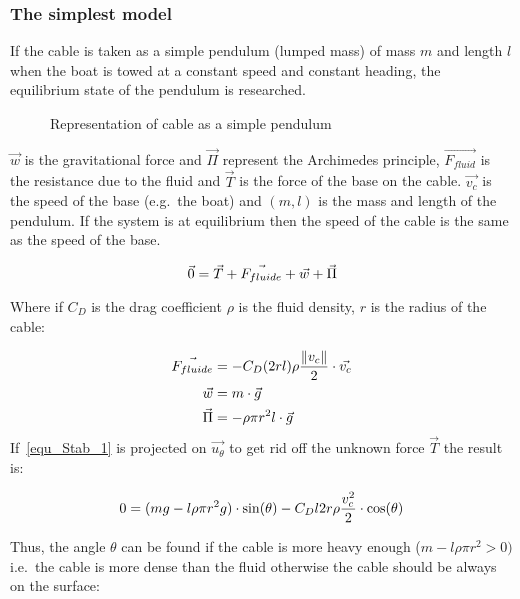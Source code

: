 \subsubsection*{The simplest model}

If the cable is taken as a simple pendulum (lumped mass) of mass $m$ and length $l$ when the boat is towed at a constant speed and constant heading, the equilibrium state of the pendulum is researched.


\begin{figure}[H]
\centering
{} %
{

}
\caption{Representation of cable as a simple pendulum}
\label{fig:model_pendulum}
\end{figure}


$\vec{w}$ is the gravitational force and $\vec{\Pi}$ represent the Archimedes principle, $\vec{F_{fluid}}$ is the resistance due to the fluid and $\vec{T}$ is the force of the base on the cable. $\vec{v_c}$ is the speed of the base (e.g.\ the boat) and $(m,l)$ is the mass and length of the pendulum. If the system is at equilibrium then the speed of the cable is the same as the speed of the base. 

\begin{equation}
 \vec{0} = \vec{T}+\vec{F_{fluide}}+\vec{w}+\vec{\Pi}\\
 \label{equ_Stab_1}
\end{equation}


Where if $C_D$ is the drag coefficient $\rho$ is the fluid density, $r$ is the radius of the cable:


{
\begin{align}
\centering
\vec{F_{fluide}} &= -C_D (2 r l) \rho \frac{ \|v_c\|}{2} \cdot \vec{v_c} \\
\vec{w} &= m \cdot \vec{g} \\
\vec{\Pi} &= - \rho \pi r^2 l \cdot \vec{g}
\end{align}
}
If~\ref{equ_Stab_1} is projected on $\vec{u_{\theta}}$ to get rid off the unknown force $\vec{T}$ the result is:

\begin{equation}
 0 = (m g - l \rho \pi r^2 g) \cdot \sin(\theta)-C_D l 2 r \rho \frac{v_c^2}{2} \cdot \cos(\theta)\\
 \label{equ_Stab_2}
\end{equation}

Thus, the angle $\theta$ can be found if the cable is more heavy enough ($m -l \rho \pi r^2 > 0)$ i.e.\ the cable is more dense than the fluid otherwise the cable should be always on the surface:

